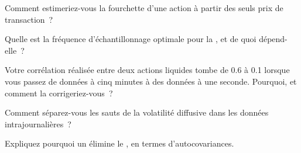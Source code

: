 \begin{interviewq}\label{iq:qm:high-frequency-econometrics:2}
Comment estimeriez-vous la fourchette d'une action à partir des seuls prix de transaction~?
\end{interviewq}

\begin{interviewq}\label{iq:qm:high-frequency-econometrics:3}
Quelle est la fréquence d'échantillonnage optimale pour la , et de quoi dépend-elle~?
\end{interviewq}

\begin{interviewq}\label{iq:qm:high-frequency-econometrics:4}
Votre corrélation réalisée entre deux actions liquides tombe de 0.6 à 0.1 lorsque vous passez de données à cinq minutes à des données à une seconde. Pourquoi, et comment la corrigeriez-vous~?
\end{interviewq}

\begin{interviewq}\label{iq:qm:high-frequency-econometrics:5}
Comment séparez-vous les sauts de la volatilité diffusive dans les données intrajournalières~?
\end{interviewq}

\begin{interviewq}\label{iq:qm:high-frequency-econometrics:6}
Expliquez pourquoi un  élimine le , en termes d'autocovariances.
\end{interviewq}
